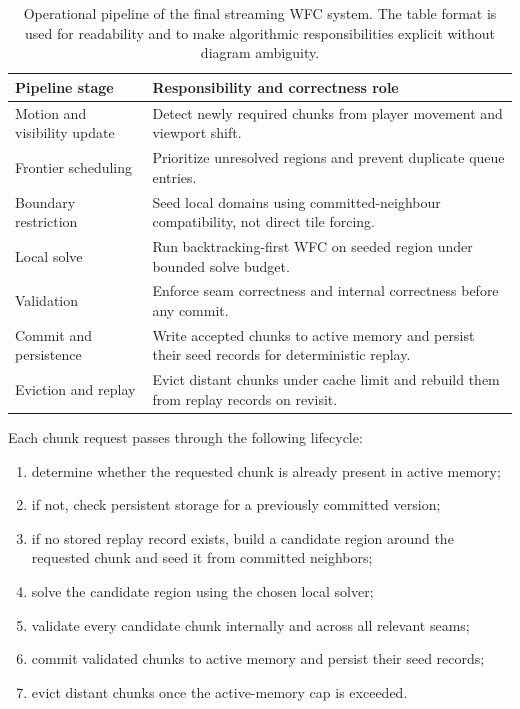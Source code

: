 \documentclass[12pt,a4paper]{report}
\begin{document}
\begin{table}[H]
\centering
\small
\begin{tabular}{p{3.1cm} p{7.2cm}}
\toprule
Pipeline stage & Responsibility and correctness role \\
\midrule
Motion and visibility update & Detect newly required chunks from player movement and viewport shift. \\
Frontier scheduling & Prioritize unresolved regions and prevent duplicate queue entries. \\
Boundary restriction & Seed local domains using committed-neighbour compatibility, not direct tile forcing. \\
Local solve & Run backtracking-first WFC on seeded region under bounded solve budget. \\
Validation & Enforce seam correctness and internal correctness before any commit. \\
Commit and persistence & Write accepted chunks to active memory and persist their seed records for deterministic replay. \\
Eviction and replay & Evict distant chunks under cache limit and rebuild them from replay records on revisit. \\
\bottomrule
\end{tabular}
\caption{Operational pipeline of the final streaming WFC system. The table format is used for readability and to make algorithmic responsibilities explicit without diagram ambiguity.}
\label{tab:pipeline}
\end{table}

Each chunk request passes through the following lifecycle:
\begin{enumerate}
\item determine whether the requested chunk is already present in active memory;
\item if not, check persistent storage for a previously committed version;
\item if no stored replay record exists, build a candidate region around the requested chunk and seed it from committed neighbors;
\item solve the candidate region using the chosen local solver;
\item validate every candidate chunk internally and across all relevant seams;
\item commit validated chunks to active memory and persist their seed records;
\item evict distant chunks once the active-memory cap is exceeded.
\end{enumerate}
\end{document}
